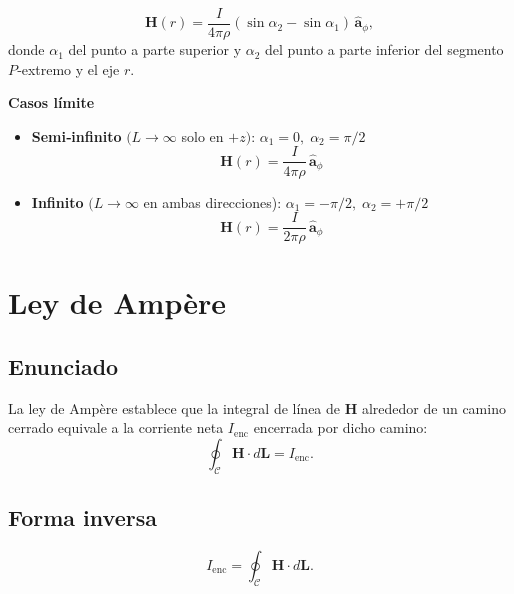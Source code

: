 \documentclass[11pt]{article}
\begin{document}
\[
\mathbf{H}(r)=
\frac{I}{4\pi {\rho}}\left(
  \sin\alpha_{2}-\sin\alpha_{1}
\right)\,\hat{\boldsymbol{a}}_{\phi},
\]
donde
\(\alpha_{1}\) del punto a parte superior y \(\alpha_{2}\) del punto a parte inferior del segmento \(P\)‑extremo y el eje \(r\).

\textbf{Casos límite}
\begin{itemize}
  \item {\bf Semi‑infinito} \((L\to\infty\) solo en \(+z)\):
        \(\alpha_{1}=0,\;\alpha_{2}=\pi/2\)
        \[
        \boxed{\mathbf{H}(r)=\dfrac{I}{4\pi {\rho}}\,\hat{\boldsymbol{a}}_{\phi}}
        \]
  \item {\bf Infinito} \((L\to\infty\) en ambas direcciones):
        \(\alpha_{1}=-\pi/2,\;\alpha_{2}=+\pi/2\)
        \[
        \boxed{\mathbf{H}(r)=\dfrac{I}{2\pi {\rho}}\,\hat{\boldsymbol{a}}_{\phi}}
        \]
\end{itemize}

\section{Ley de Ampère}
\subsection*{Enunciado}
La ley de Ampère establece que la integral de línea de \(\mathbf{H}\)
alrededor de un camino cerrado equivale a la corriente neta \(I_{\mathrm{enc}}\)
encerrada por dicho camino:
\[
\oint_{\mathcal{C}}\mathbf{H}\cdot d\mathbf{L}= I_{\mathrm{enc}}.
\]

\subsection*{Forma inversa}
\[
I_{\mathrm{enc}}=\oint_{\mathcal{C}}\mathbf{H}\cdot d\mathbf{L}.
\]

\end{document}
